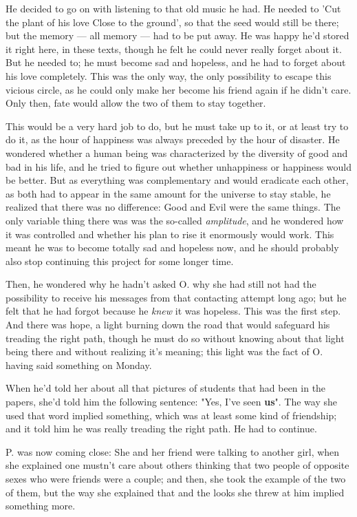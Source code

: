 He decided to go on with listening to that old music he had. He needed to 'Cut the plant of his love Close to the ground', so that the seed would still be there; but the memory --- all memory --- had to be put away. He was happy he'd stored it right here, in these texts, though he felt he could never really forget about it. But he needed to; he must become sad and hopeless, and he had to forget about his love completely. This was the only way, the only possibility to escape this vicious circle, as he could only make her become his friend again if he didn't care. Only then, fate would allow the two of them to stay together.

This would be a very hard job to do, but he must take up to it, or at least try to do it, as the hour of happiness was always preceded by the hour of disaster. 
He wondered whether a human being was characterized by the diversity of good and bad in his life, and he tried to figure out whether unhappiness or happiness would be better. 
But as everything was complementary and would eradicate each other, as both had to appear in the same amount for the universe to stay stable, he realized that there was no difference: Good and Evil were the same things. The only variable thing there was was the so-called \emph{amplitude}, and he wondered how it was controlled and whether his plan to rise it enormously would work. 
This meant he was to become totally sad and hopeless now, and he should probably also stop continuing this project for some longer time.

Then, he wondered why he hadn't asked O. why she had still not had the possibility to receive his messages from that contacting attempt long ago; but he felt that he had forgot because he \emph{knew} it was hopeless. This was the first step.
And there was hope, a light burning down the road that would safeguard his treading the right path, though he must do so without knowing about that light being there and without realizing it's meaning; this light was the fact of O. having said something on Monday.

When he'd told her about all that pictures of students that had been in the papers, she'd told him the following sentence: "Yes, I've seen \textbf{us}". The way she used that word implied something, which was at least some kind of friendship; and it told him he was really treading the right path.
He had to continue.

P. was now coming close: She and her friend were talking to another girl, when she explained one mustn't care about others thinking that two people of opposite sexes who were friends were a couple; and then, she took the example of the two of them, but the way she explained that and the looks she threw at him implied something more.

